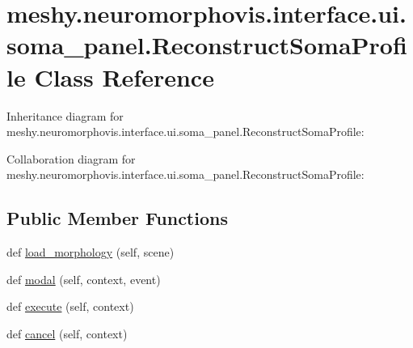 \hypertarget{classmeshy_1_1neuromorphovis_1_1interface_1_1ui_1_1soma__panel_1_1ReconstructSomaProfile}{}\section{meshy.\+neuromorphovis.\+interface.\+ui.\+soma\+\_\+panel.\+Reconstruct\+Soma\+Profile Class Reference}
\label{classmeshy_1_1neuromorphovis_1_1interface_1_1ui_1_1soma__panel_1_1ReconstructSomaProfile}


Inheritance diagram for meshy.\+neuromorphovis.\+interface.\+ui.\+soma\+\_\+panel.\+Reconstruct\+Soma\+Profile\+:


Collaboration diagram for meshy.\+neuromorphovis.\+interface.\+ui.\+soma\+\_\+panel.\+Reconstruct\+Soma\+Profile\+:
\subsection*{Public Member Functions}
\begin{DoxyCompactItemize}
\item 
def \hyperlink{classmeshy_1_1neuromorphovis_1_1interface_1_1ui_1_1soma__panel_1_1ReconstructSomaProfile_a70ded24e48a6a69245d20807384f9565}{load\+\_\+morphology} (self, scene)
\item 
def \hyperlink{classmeshy_1_1neuromorphovis_1_1interface_1_1ui_1_1soma__panel_1_1ReconstructSomaProfile_aa185dcd198584bbc4d24dcb3c946db0c}{modal} (self, context, event)
\item 
def \hyperlink{classmeshy_1_1neuromorphovis_1_1interface_1_1ui_1_1soma__panel_1_1ReconstructSomaProfile_a37c524cdde47afa06479d9b970b32c19}{execute} (self, context)
\item 
def \hyperlink{classmeshy_1_1neuromorphovis_1_1interface_1_1ui_1_1soma__panel_1_1ReconstructSomaProfile_a4690bddaf9774c9fb610acd3b039ccc7}{cancel} (self, context)
\end{DoxyCompactItemize}
